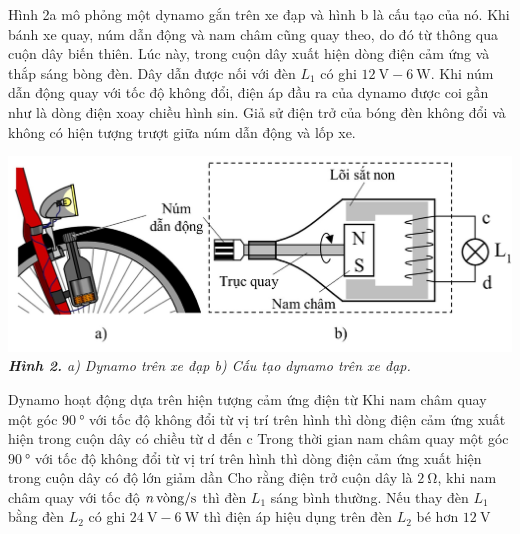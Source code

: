 \begin{ex}
	Hình 2a mô phỏng một dynamo gắn trên xe đạp và hình b là cấu tạo của nó. Khi bánh xe quay, núm dẫn động và nam châm cũng quay theo, do đó từ thông qua cuộn dây biến thiên. Lúc này, trong cuộn dây xuất hiện dòng điện cảm ứng và thắp sáng bòng đèn. Dây dẫn được nối với đèn $L_1$ có ghi $\SI{12}{\volt}-\SI{6}{\watt}$. Khi núm dẫn động quay với tốc độ không đổi, điện áp đầu ra của dynamo được coi gần như là dòng điện xoay chiều hình sin. Giả sử điện trở của bóng đèn không đổi và không có hiện tượng trượt giữa núm dẫn động và lốp xe.
	\begin{center}
		\includegraphics[scale=0.4]{../figs/THPTQG-001-2}\\
		\textit{\textbf{Hình 2.} a) Dynamo trên xe đạp b) Cấu tạo dynamo trên xe đạp.}
	\end{center}
	\choiceTF
	{\True Dynamo hoạt động dựa trên hiện tượng cảm ứng điện từ}
	{\True Khi nam châm quay một góc $\SI{90}{\degree}$ với tốc độ không đổi từ vị trí trên hình thì dòng điện cảm ứng xuất hiện trong cuộn dây có chiều từ d đến c}
	{Trong thời gian nam châm quay một góc $\SI{90}{\degree}$ với tốc độ không đổi từ vị trí trên hình thì dòng điện cảm ứng xuất hiện trong cuộn dây có độ lớn giảm dần}
	{Cho rằng điện trở cuộn dây là $\SI{2}{\ohm}$, khi nam châm quay với tốc độ $\xsi{n}{\text{vòng}/\second}$ thì đèn $L_1$ sáng bình thường. Nếu thay đèn $L_1$ bằng đèn $L_2$ có ghi $\SI{24}{\volt}-\SI{6}{\watt}$ thì điện áp hiệu dụng trên đèn $L_2$ bé hơn $\SI{12}{\volt}$}
	\loigiai{}
\end{ex}
